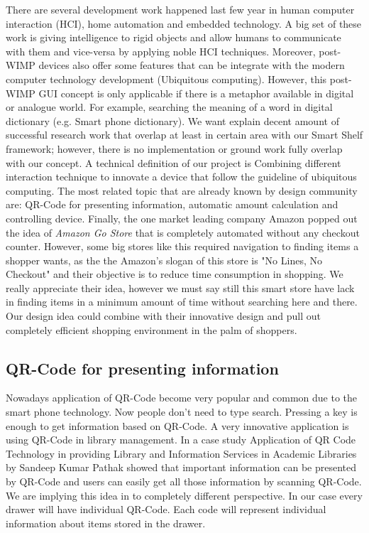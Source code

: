 There are several development work happened last few year in human computer interaction (HCI), home automation and embedded technology. 
A big set of these work is giving intelligence to rigid objects and allow humans to communicate with them and vice-versa by applying noble HCI techniques. 
Moreover, post-WIMP devices also offer some features that can be integrate with the modern computer technology development (Ubiquitous computing). 
However, this post-WIMP GUI concept is only applicable if there is a metaphor available in digital or analogue world. 
For example, searching the meaning of a word in digital dictionary (e.g. Smart phone dictionary).
We want explain decent amount of successful research work that overlap at least in certain area with our Smart Shelf framework; however, there is no implementation or ground work fully overlap with our concept. 
A technical definition of our project is \grqq{}Combining different interaction technique to innovate a device that follow the guideline of ubiquitous computing\grqq{}.
The most related topic that are already known by design community are: QR-Code for presenting information, automatic amount calculation and controlling device. 
Finally, the one market leading company Amazon popped out the idea of \textit{Amazon Go Store} that is completely automated without any checkout counter. 
However, some big stores like this required navigation to finding items a shopper wants, as the the Amazon's slogan of this store is "No Lines, No Checkout" and their objective is to reduce time consumption in shopping. 
We really appreciate their idea, however we must say still this smart store have lack in finding items in a minimum amount of time without searching here and there. 
Our design idea could combine with their innovative design and pull out completely efficient shopping environment in the palm of shoppers. 
 
\subsection{QR-Code for presenting information} 
Nowadays application of QR-Code become very popular and common due to the smart phone technology. 
Now people don't need to type search. 
Pressing a key is enough to get information based on QR-Code. 
A very innovative application is using QR-Code in library management. 
In a case study \grqq{}Application of QR Code Technology in providing Library and Information Services in Academic Libraries\grqq{} \cite{RefWorks:iitgn} by  Sandeep
Kumar Pathak showed that important information can be presented by QR-Code and users can easily get all those information by scanning QR-Code. 
We are implying this idea in to completely different perspective.
In our case every drawer will have individual QR-Code. 
Each code will represent individual information about items stored in the drawer. 

